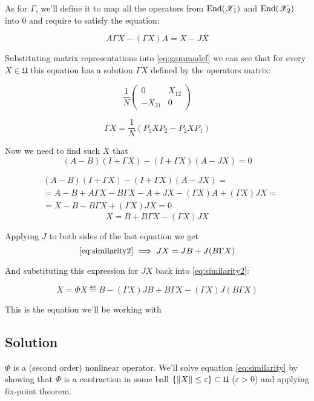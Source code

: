 \documentclass{article}
\begin{document}
As for $\Gamma$, we'll define it to map
all the operators from $\mathrm{End}({\mathscr X_1})$ and $\mathrm{End}({\mathscr X_2})$ into $0$
and require to satisfy the equation:

\begin{equation}
\label{eq:gammadef}
    A\Gamma X - (\Gamma X) A = X - JX
\end{equation}

Substituting matrix representations into \eqref{eq:gammadef} we can see
that for every $X \in \mathfrak U$ this equation has a solution $\Gamma X$
defined by the operators matrix:

$$
\frac{1}{N}
\begin{pmatrix}
    0       & X_{12} \\
    -X_{21} & 0
\end{pmatrix}
$$

$$\Gamma X = \frac{1}{N} (P_1 X P_2 - P_2 X P_1)$$

Now we need to find such $X$ that
\begin{equation}\label{eq:similarity1}
    (A - B)(I + \Gamma X) - (I + \Gamma X)(A - JX) = 0
\end{equation}

$$\begin{aligned}
    & (A - B)(I + \Gamma X) - (I + \Gamma X)(A - JX) = \\
    & = A - B + A\Gamma X - B\Gamma X - A + JX - (\Gamma X) A + (\Gamma X) JX = \\
    & = X - B - B\Gamma X + (\Gamma X) JX = 0
\end{aligned}$$
\begin{equation}\label{eq:similarity2}
    X = B + B\Gamma X - (\Gamma X) JX
\end{equation}

Applying $J$ to both sides of the last equation we get
$$\eqref{eq:similarity2} \implies
JX = JB + J(B\Gamma X)$$

And substituting this expression for $JX$ back into \eqref{eq:similarity2}:

\begin{equation}\label{eq:similarity}
    X = \Phi X \eqdef B - (\Gamma X) JB + B\Gamma X - (\Gamma X) J(B\Gamma X)
\end{equation}

This is the equation we'll be working with

\subsection{Solution}
$\Phi$ is a (second order) nonlinear operator.
We'll solve equation \eqref{eq:similarity}
by showing that $\Phi$ is a contraction in some ball $\{ \left\|{X}\right\| \leq \varepsilon \} \subset \mathfrak U$ ($\varepsilon>0$)
and applying fix-point theorem.
\end{document}
